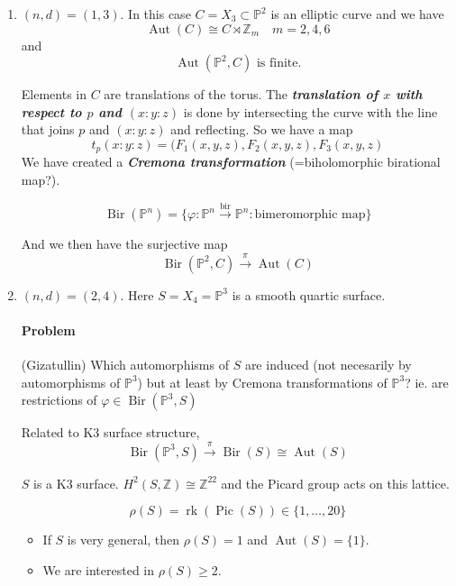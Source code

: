 \begin{enumerate}
	\item $(n,d)=(1,3)$. In this case  $C=X_3\subset \mathbb{P}^2$ is an elliptic curve and we have
		\[\operatorname{Aut}(C)\cong C\rtimes \mathbb{Z}_m\quad m=2,4,6\]
and
 \[\operatorname{Aut}(\mathbb{P}^2,C)\text{ is finite.} \]

 Elements in $C$ are translations of the torus. The \textit{\textbf{translation of $x$ with respect to $p$ and $(x:y:z)$}} is done by intersecting the curve with the line that joins $p$ and $(x:y:z)$ and reflecting. So we have a map
  \[t_p(x:y:z)=(F_1(x,y,z),F_2(x,y,z),F_3(x,y,z)\]
  We have created a \textit{\textbf{Cremona transformation}} (=biholomorphic birational map?).
 
  \begin{defn}
	\[\operatorname{Bir}(\mathbb{P}^n)=\{\varphi :\mathbb{P}^n\overset{\operatorname{bir}}{\longrightarrow}\mathbb{P}^n:\text{bimeromorphic map} \}\]
\end{defn}

And we then have the surjective map
\[\operatorname{Bir}(\mathbb{P}^2,C)\overset{\pi}{\longrightarrow}\operatorname{Aut}(C)\]


	\item $(n,d)=(2,4)$. Here  $S=X_4=\mathbb{P}^3$ is a smooth quartic surface.

		\paragraph{Problem} (Gizatullin) Which automorphisms of $S$ are induced (not necesarily by automorphisms of $\mathbb{P}^3$) but at least by Cremona transformations of $\mathbb{P}^3$? ie. are restrictions of $\varphi\in\operatorname{Bir}(\mathbb{P}^3,S)$

\begin{remark}
	Related to K3 surface structure,
	\[\operatorname{Bir}(\mathbb{P}^3,S)\overset{\pi}{\longrightarrow}\operatorname{Bir}(S)\cong \operatorname{Aut}(S)\]
\end{remark}

$S$ is a K3 surface. $H^{2}(S,\mathbb{Z})\cong \mathbb{Z}^{22}$ and the Picard group acts on this lattice.

\begin{defn}
	\[\rho(S)=\operatorname{rk}(\operatorname{Pic}(S))\in\{1,\ldots,20\}\]
\end{defn}

\begin{itemize}
\item If $S$ is very general, then $\rho(S)=1$ and $\operatorname{Aut}(S)=\{1\}$.

\item We are interested in $\rho(S)\geq 2$.
\end{itemize}
\end{enumerate}

